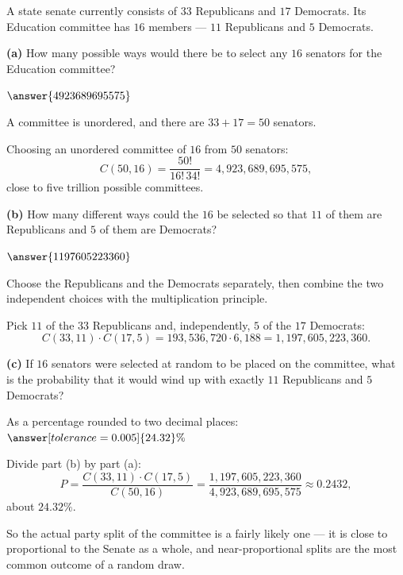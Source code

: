 \documentclass[12pt]{ximera}
\begin{document}
\begin{problem}
A state senate currently consists of $33$ Republicans and $17$ Democrats. Its
Education committee has $16$ members --- $11$ Republicans and $5$ Democrats.

\begin{prompt}
\textbf{(a)} How many possible ways would there be to select any $16$ senators for
the Education committee?

$\answer{4923689695575}$

\begin{hint}
A committee is unordered, and there are $33+17=50$ senators.
\end{hint}

\begin{feedback}
Choosing an unordered committee of $16$ from $50$ senators:
\[
C(50,16)=\frac{50!}{16!\,34!}=4{,}923{,}689{,}695{,}575,
\]
close to five trillion possible committees.
\end{feedback}
\end{prompt}

\begin{prompt}
\textbf{(b)} How many different ways could the $16$ be selected so that $11$ of them
are Republicans and $5$ of them are Democrats?

$\answer{1197605223360}$

\begin{hint}
Choose the Republicans and the Democrats separately, then combine the two
independent choices with the multiplication principle.
\end{hint}

\begin{feedback}
Pick $11$ of the $33$ Republicans and, independently, $5$ of the $17$ Democrats:
\[
C(33,11)\cdot C(17,5) = 193{,}536{,}720 \cdot 6{,}188 = 1{,}197{,}605{,}223{,}360.
\]
\end{feedback}
\end{prompt}

\begin{prompt}
\textbf{(c)} If $16$ senators were selected at random to be placed on the committee,
what is the probability that it would wind up with exactly $11$ Republicans and $5$
Democrats?

As a percentage rounded to two decimal places: $\answer[tolerance=0.005]{24.32}\%$

\begin{feedback}
Divide part (b) by part (a):
\[
P = \frac{C(33,11)\cdot C(17,5)}{C(50,16)}
  = \frac{1{,}197{,}605{,}223{,}360}{4{,}923{,}689{,}695{,}575}
  \approx 0.2432,
\]
about $24.32\%$.

So the actual party split of the committee is a fairly likely one --- it is close to
proportional to the Senate as a whole, and near-proportional splits are the most
common outcome of a random draw.
\end{feedback}
\end{prompt}
\end{problem}
\end{document}
